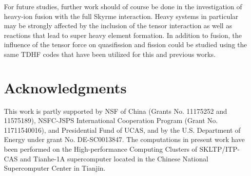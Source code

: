 For future studies, further work should of course be done in the investigation of heavy-ion fusion with the full Skyrme interaction.
Heavy systems in particular may be strongly affected by the inclusion of the tensor interaction as well as reactions that lead to super heavy element formation.
In addition to fusion, the influence of the tensor force on quasifission and fission could be studied using the same TDHF codes that have been utilized for this and previous works.


\label{summary}

\section{Acknowledgments}
This work is partly supported by NSF of China (Grants No. 11175252 and 11575189),
NSFC-JSPS International Cooperation Program (Grant No. 11711540016), and Presidential Fund of UCAS,
and by the U.S. Department of Energy under grant No. DE-SC0013847.
The computations in present work have been performed on the High-performance Computing Clusters of SKLTP/ITP-CAS and
Tianhe-1A supercomputer located in the Chinese National Supercomputer Center in Tianjin.


\clearpage


